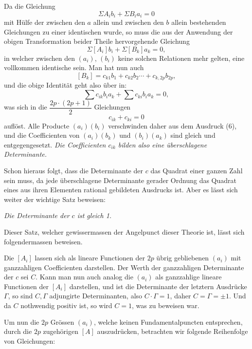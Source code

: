 \documentclass[10pt]{article}
\begin{document}
Da die Gleichung
\[
\Sigma A_i b_i+\Sigma B_i a_i=0
\]
mit Hülfe der zwischen den \(a\) allein und zwischen den \(b\) allein bestehenden Gleichungen zu einer identischen wurde, so muss die aus der Anwendung der obigen Transformation beider Theile hervorgehende Gleichung
\[
\Sigma[A_i]b_i+\Sigma[B_k]a_k=0,
\]
in welcher zwischen den \((a_i)\), \((b_i)\) keine solchen Relationen mehr gelten, eine vollkommen identische sein. Man hat nun auch
\[
[B_k]=c_{k1}b_1+c_{k2}b_2\cdots+c_{k,2p}b_{2p},
\]
und die obige Identität geht also über in:
\[
\sum c_{ik}b_i a_k+\sum c_{ki}b_i a_k=0,
\]
was sich in die \(\dfrac{2p\cdot(2p+1)}{2}\) Gleichungen
\[
c_{ik}+c_{ki}=0
\]
auflöst. Alle Producte \((a_i)(b_i)\) verschwinden daher aus dem Ausdruck (6), und die Coefficienten von \((a_i)(b_k)\) und \((b_i)(a_k)\) sind gleich und entgegengesetzt. \emph{Die Coefficienten \(c_{ik}\) bilden also eine überschlagene Determinante.}

Schon hieraus folgt, dass die Determinante der \(c\) das Quadrat einer ganzen Zahl sein muss, da jede überschlagene Determinante gerader Ordnung das Quadrat eines aus ihren Elementen rational gebildeten Ausdrucks ist. Aber es lässt sich weiter der wichtige Satz beweisen:

\begin{center}
\emph{Die Determinante der \(c\) ist gleich 1.}
\end{center}

Dieser Satz, welcher gewissermassen der Angelpunct dieser Theorie ist, lässt sich folgendermassen beweisen.

Die \([A_i]\) lassen sich als lineare Functionen der \(2p\) übrig gebliebenen \((a_i)\) mit ganzzahligen Coefficienten darstellen. Der Werth der ganzzahligen Determinante der \(c\) sei \(C\). Kann man nun auch analog die \((a_i)\) als ganzzahlige lineare Functionen der \([A_i]\) darstellen, und ist die Determinante der letztern Ausdrücke \(\Gamma\), so sind \(C,\Gamma\) adjungirte Determinanten, also \(C\cdot\Gamma=1\), daher \(C=\Gamma=\pm1\). Und da \(C\) nothwendig positiv ist, so wird \(C=1\), was zu beweisen war.

Um nun die \(2p\) Grössen \((a_i)\), welche keinen Fundamentalpuncten entsprechen, durch die \(2p\) zugehörigen \([A]\) auszudrücken, betrachten wir folgende Reihenfolge von Gleichungen:
\end{document}
